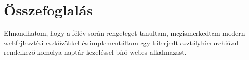 \chapter{Összefoglalás}\label{sect:Summary}

\hspace{2mm} Elmondhatom, hogy a félév során rengeteget tanultam, megismerkedtem modern webfejlesztési eszközökkel és implementáltam egy kiterjedt osztályhierarchiával rendelkező komolya naptár kezeléssel bíró webes alkalmazást. 